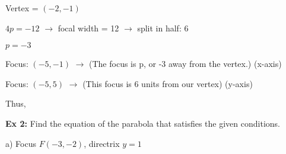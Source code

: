 \documentclass{report}
\begin{document}
\begin{center}
Vertex = $(-2,-1)$
\vspace{2mm}

$4p = -12$  $\rightarrow$ focal width = 12 $\rightarrow$ split in half: 6
\vspace{2mm}

$p = -3$
\vspace{2mm}

Focus: $(-5,-1)$ $\rightarrow$ (The focus is p, or -3 away from the vertex.) (x-axis)
\vspace{2mm}

Focus: $(-5,5)$ $\rightarrow$ (This focus is 6 units from our vertex) (y-axis)
\vspace{2mm}

Thus,
\bigbreak \noindent \bigbreak \noindent \bigbreak \noindent

\end{center}
\bigbreak \noindent \bigbreak \noindent
\begin{large}
	\textbf{Ex 2:}
	Find the equation of the parabola that satisfies the given conditions.
\end{large}
\bigbreak \noindent \bigbreak \noindent \bigbreak \noindent
\begin{large}
 a) Focus $F$$(-3,-2)$, directrix $y=1$ 
\end{large}
\vspace{3mm}
\end{document}
